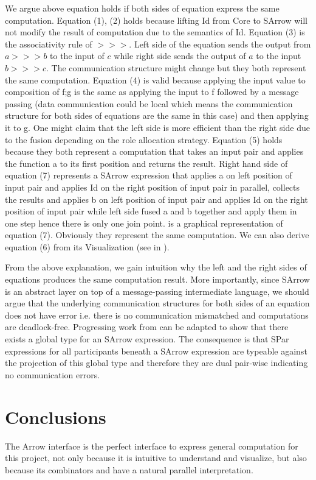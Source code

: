 We argue above equation holds if both sides of equation express the same computation. Equation (1), (2) holds because lifting Id from Core to SArrow will not modify the result of computation due to the semantics of Id. Equation (3) is the associativity rule of $>>>$. Left side of the equation sends the output from $a >>> b$ to the input of $c$ while right side sends the output of $a$ to the input $b >>> c$. The communication structure might change but they both represent the same computation. Equation (4) is valid because applying the input value to composition of f;g is the same as applying the input to f followed by a message passing (data communication could be local which means the communication structure for both sides of equations are the same in this case) and then applying it to g. One might claim that the left side is more efficient than the right side due to the fusion depending on the role allocation strategy. Equation (5) holds because they both represent a computation that takes an input pair and applies the function a to its first position and returns the result. Right hand side of equation (7) represents a SArrow expression that applies a on left position of input pair and applies Id on the right position of input pair in parallel, collects the results and applies b on left position of input pair and applies Id on the right position of input pair while left side fused a and b together and apply them in one step hence there is only one join point.  is a graphical representation of equation (7). Obviously they represent the same computation. We can also derive equation (6) from its Visualization (see in ).

From the above explanation, we gain intuition why the left and the right sides of equations produces the same computation result. More importantly, since SArrow is an abstract layer on top of a message-passing intermediate language, we should argue that the underlying communication structures for both sides of an equation does not have error i.e. there is no communication mismatched and computations are deadlock-free. Progressing work from \cite{AlgebraicMultipartyProtocol} can be adapted to show that there exists a global type for an SArrow expression. The consequence is that SPar expressions for all participants beneath a SArrow expression are typeable against the projection of this global type and therefore they are dual pair-wise indicating no communication errors.

\section{Conclusions}
The Arrow interface is the perfect interface to express general computation for this pro\-ject, not only because it is intuitive to understand and visualize, but also because its combinators \hask{***} and \hask{&&&} have a natural parallel interpretation. 

